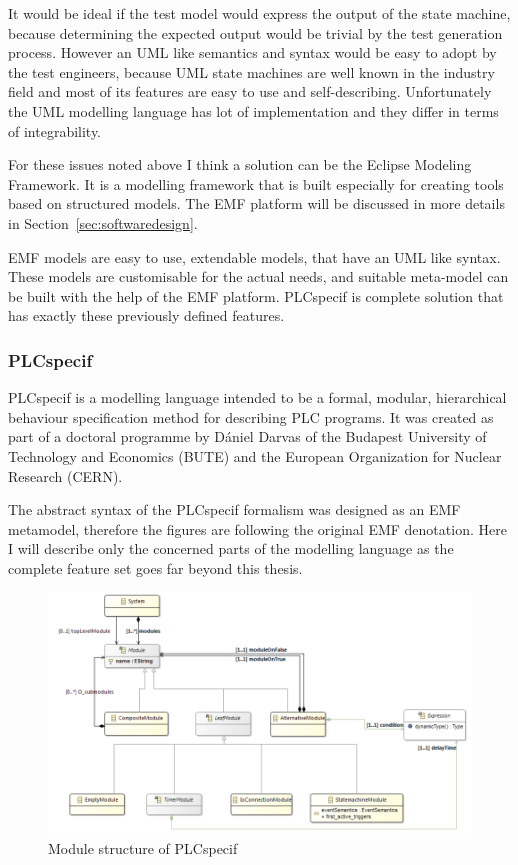 It would be ideal if the test model would express the output of the state machine, because determining the expected output would be trivial by the test generation process. However an UML like semantics and syntax would be easy to adopt by the test engineers, because UML state machines are well known in the industry field and most of its features are easy to use and self-describing. Unfortunately the UML modelling language has lot of implementation and they differ in terms of integrability.

For these issues noted above I think a solution can be the Eclipse Modeling Framework. It is a modelling framework that is built especially for creating tools based on structured models. The EMF platform will be discussed in more details in Section~\ref{sec:softwaredesign}.

EMF models are easy to use, extendable models, that have an UML like syntax.  These models are customisable for the actual needs, and suitable meta-model can be built with the help of the EMF platform. PLCspecif is complete solution that has exactly these previously defined features.

\subsubsection{PLCspecif}
\label{ssub:plcspecif}

PLCspecif is a modelling language intended to be a formal, modular, hierarchical behaviour specification method for describing PLC programs. It was created as part of a doctoral programme by Dániel Darvas of the Budapest University of Technology and Economics (BUTE) and the European Organization for Nuclear Research (CERN).

The abstract syntax of the PLCspecif formalism was designed as an EMF metamodel, therefore the figures are following the original EMF denotation. Here I will describe only the concerned parts of the modelling language as the complete feature set goes far beyond this thesis.

\begin{figure}[htp]
\centering
\includegraphics[scale=0.45]{figures/plchsm_modules}
\caption{Module structure of PLCspecif \cite{plcspecif}}
\label{fig:plchsm_modules}
\end{figure}

